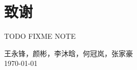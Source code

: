 
\chapter{致谢}
	TODO
	FIXME
	NOTE
	

\vskip 108pt
\begin{flushright}
	王永锋，颜彬，李沐晗，何冠岚，张家豪 \\
\today
\end{flushright}


